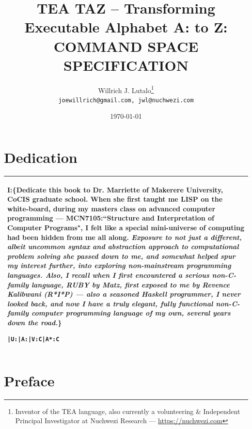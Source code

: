 \documentclass[a4paper, 18pt]{book} %
\title{\textbf{TEA TAZ} – \textbf{T}ransforming \textbf{E}xecutable \textbf{A}lphabet A: to Z: COMMAND SPACE SPECIFICATION}
\author{Willrich J. Lutalo\thanks{Inventor of the TEA language, also currently a volunteering \& Independent Principal Investigator at Nuchwezi Research --- \url{https://nuchwezi.com}}\\
\texttt{joewillrich@gmail.com, jwl@nuchwezi.com}}
\date{\today}
\begin{document}
\Large










\maketitle

\chapter*{Dedication}


\begin{table}[H]
  \centering
  \LARGE
	\begin{tabular}[t]{|p{}}
I:\{\textbf{Dedicate this book to Dr. Marriette of Makerere University, CoCIS graduate school.} When she first taught me LISP on the white-board, during my masters class on advanced computer programming --- \textbf{MCN7105}:``Structure and Interpretation of Computer Programs", I felt like a special mini-universe of computing had been hidden from me all along. \textit{Exposure to not just a different, albeit uncommon syntax and abstraction approach to computational problem solving she passed down to me, and somewhat helped spur my interest further, into exploring non-mainstream programming languages. Also, I recall when I first encountered a serious non-C-family language, RUBY by Matz, first exposed to me by Revence Kalibwani (R*I*P) --- also a seasoned Haskell programmer, I never looked back, and now I have a truly elegant, fully functional non-C-family computer programming language of my own, several years down the road.}\}
\begin{verbatim}
|U:|A:|V:C|A*:C 
\end{verbatim}
\\
	\hline
	              
\end{tabular}
  \label{TABDEDC}
\end{table}


\chapter*{Preface}
\end{document}

